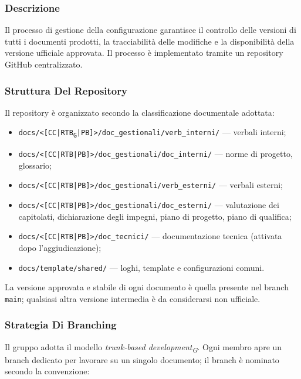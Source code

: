 \subsubsection{Descrizione}
 
Il processo di gestione della configurazione garantisce il controllo delle versioni
di tutti i documenti prodotti, la tracciabilità delle modifiche e la disponibilità
della versione ufficiale approvata. Il processo è implementato tramite un
repository GitHub centralizzato.
 
\subsubsection{Struttura Del Repository}
 
Il repository è organizzato secondo la classificazione documentale adottata:
 
\begin{itemize}
  \item \texttt{docs/<[CC|RTB\textsubscript{G}|PB]>/doc\_gestionali/verb\_interni/} — verbali interni;
  \item \texttt{docs/<[CC|RTB|PB]>/doc\_gestionali/doc\_interni/} — norme di progetto,
        glossario;
  \item \texttt{docs/<[CC|RTB|PB]>/doc\_gestionali/verb\_esterni/} — verbali esterni;
  \item \texttt{docs/<[CC|RTB|PB]>/doc\_gestionali/doc\_esterni/} — valutazione dei
        capitolati, dichiarazione degli impegni, piano di progetto, piano di
        qualifica;
  \item \texttt{docs/<[CC|RTB|PB]>/doc\_tecnici/} — documentazione tecnica (attivata
        dopo l'aggiudicazione);
  \item \texttt{docs/template/shared/} — loghi, template e configurazioni comuni.
\end{itemize}
 
La versione approvata e stabile di ogni documento è quella presente nel branch
\texttt{main}; qualsiasi altra versione intermedia è da considerarsi non ufficiale.
 
\subsubsection{Strategia Di Branching}
 
Il gruppo adotta il modello \textit{trunk-based development\textsubscript{G}}.
Ogni membro apre un branch dedicato per lavorare su un singolo
documento; il branch è nominato secondo la convenzione:
 
